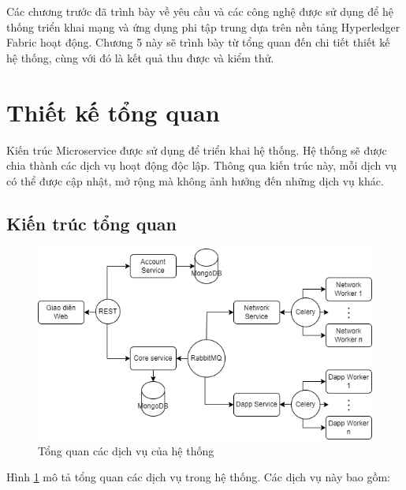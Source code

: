 \documentclass[../DoAn.tex]{subfiles}
\begin{document}
Các chương trước đã trình bày về yêu cầu và các công nghệ được sử dụng để hệ
thống triển khai mạng và ứng dụng phi tập trung dựa trên nền tảng
Hyperledger Fabric hoạt động. Chương 5 này sẽ trình bày từ tổng quan đến chi
tiết thiết kế hệ thống, cùng với đó là kết quả thu được và kiểm thử.

\section{Thiết kế tổng quan}

Kiến trúc Microservice được sử dụng để triển khai hệ thống. Hệ thống sẽ được
chia thành các dịch vụ hoạt động độc lập. Thông qua kiến trúc này, mỗi dịch vụ
có thể được cập nhật, mở rộng mà không ảnh hưởng đến những dịch vụ khác.

\subsection{Kiến trúc tổng quan}

\begin{figure}[H]
    \centering
    \includegraphics[width=0.75\linewidth]{Hinhve/DoAn-KienTrucTongQuan.drawio.png}
    \caption{Tổng quan các dịch vụ của hệ thống}
    \label{fig:overal_architecture}
\end{figure}

Hình \ref{fig:overal_architecture} mô tả tổng quan các dịch vụ trong hệ thống.
Các dịch vụ này bao gồm:
\end{document}
